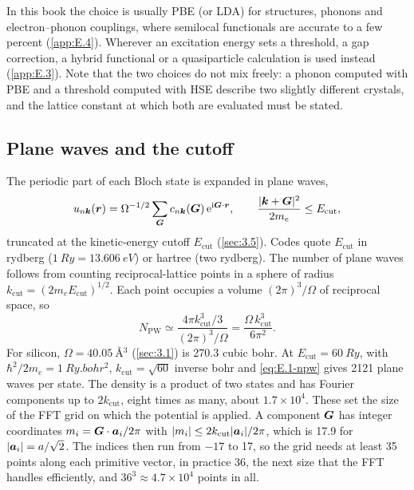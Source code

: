 In this book the choice is usually PBE (or LDA) for structures, phonons and electron--phonon couplings, where semilocal functionals are accurate to a few percent (\cref{app:E.4}). Wherever an excitation energy sets a threshold, a gap correction, a hybrid functional or a quasiparticle calculation is used instead (\cref{app:E.3}). Note that the two choices do not mix freely: a phonon computed with PBE and a threshold computed with HSE describe two slightly different crystals, and the lattice constant at which both are evaluated must be stated.

\subsection{Plane waves and the cutoff}

The periodic part of each Bloch state is expanded in plane waves,
\begin{equation*}
  u_{n\bm{k}}(\bm{r}) = \Omega^{-1/2}\sum_{\bm{G}}c_{n\bm{k}}(\bm{G})\,\mathrm{e}^{\mathrm{i}\bm{G}\cdot\bm{r}}, \qquad \frac{|\bm{k} + \bm{G}|^2}{2m_e} \le E_{\mathrm{cut}} ,
\end{equation*}
truncated at the kinetic-energy cutoff $E_{\mathrm{cut}}$ (\cref{sec:3.5}). Codes quote $E_{\mathrm{cut}}$ in rydberg ($\SI{1}{Ry} = \SI{13.606}{eV}$) or hartree (two rydberg). The number of plane waves follows from counting reciprocal-lattice points in a sphere of radius $k_{\mathrm{cut}} = (2m_eE_{\mathrm{cut}})^{1/2}$. Each point occupies a volume $(2\pi)^3/\Omega$ of reciprocal space, so
\begin{equation}
  N_{\mathrm{PW}} \simeq \frac{4\pi k_{\mathrm{cut}}^3/3}{(2\pi)^3/\Omega} = \frac{\Omega\,k_{\mathrm{cut}}^3}{6\pi^2} .
  \label{eq:E.1-npw}
\end{equation}
For silicon, $\Omega = \SI{40.05}{\angstrom^3}$ (\cref{sec:3.1}) is 270.3 cubic bohr. At $E_{\mathrm{cut}} = \SI{60}{Ry}$, with $\hbar^2/2m_e = \SI{1}{Ry.bohr^2}$, $k_{\mathrm{cut}} = \sqrt{60}$ inverse bohr and \cref{eq:E.1-npw} gives 2121 plane waves per state. The density is a product of two states and has Fourier components up to $2k_{\mathrm{cut}}$, eight times as many, about $1.7\times10^4$. These set the size of the FFT grid on which the potential is applied. A component $\bm{G}$ has integer coordinates $m_i = \bm{G}\cdot\bm{a}_i/2\pi$ with $|m_i| \le 2k_{\mathrm{cut}}|\bm{a}_i|/2\pi$, which is 17.9 for $|\bm{a}_i| = a/\sqrt{2}$. The indices then run from $-17$ to 17, so the grid needs at least 35 points along each primitive vector, in practice 36, the next size that the FFT handles efficiently, and $36^3 \approx 4.7\times10^4$ points in all.

